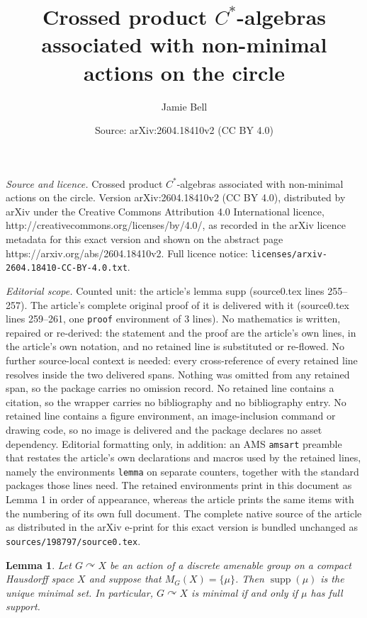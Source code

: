 \documentclass[10pt,a4paper]{amsart}
\title{Crossed product $C^*$-algebras associated with non-minimal actions on the circle}
\author{Jamie Bell}
\date{Source: arXiv:2604.18410v2 (CC BY 4.0)}
\newtheorem{lemma}{Lemma}
\DeclareMathOperator{\supp}{supp}
\begin{document}
\maketitle

\noindent\emph{Source and licence.} Crossed product $C^*$-algebras associated with non-minimal actions on the circle. Version arXiv:2604.18410v2 (CC BY 4.0), distributed by arXiv under the Creative Commons Attribution 4.0 International licence, http://creativecommons.org/licenses/by/4.0/, as recorded in the arXiv licence metadata for this exact version and shown on the abstract page https://arxiv.org/abs/2604.18410v2. Full licence notice: \texttt{licenses/arxiv-2604.18410-CC-BY-4.0.txt}.\par\smallskip

\noindent\textit{Editorial scope.} Counted unit: the article's lemma supp (source0.tex lines 255--257). The article's complete original proof of it is delivered with it (source0.tex lines 259--261, one \texttt{proof} environment of 3 lines). No mathematics is written, repaired or re-derived: the statement and the proof are the article's own lines, in the article's own notation, and no retained line is substituted or re-flowed.  No further source-local context is needed: every cross-reference of every retained line resolves inside the two delivered spans.  Nothing was omitted from any retained span, so the package carries no omission record.  No retained line contains a citation, so the wrapper carries no bibliography and no bibliography entry.  No retained line contains a figure environment, an image-inclusion command or drawing code, so no image is delivered and the package declares no asset dependency.  Editorial formatting only, in addition: an AMS \texttt{amsart} preamble that restates the article's own declarations and macros used by the retained lines, namely the environments \texttt{lemma} on separate counters, together with the standard packages those lines need.  The retained environments print in this document as Lemma 1 in order of appearance, whereas the article prints the same items with the numbering of its own full document.  The complete native source of the article as distributed in the arXiv e-print for this exact version is bundled unchanged as \texttt{sources/198797/source0.tex}.
\begin{lemma}\label{L-minimal supp}
    Let $G\curvearrowright X$ be an action of a discrete amenable group on a compact Hausdorff space $X$ and suppose that $M_G(X) = \{\mu\}$. Then $\supp(\mu)$ is the unique minimal set. In particular, $G\curvearrowright X$ is minimal if and only if $\mu$ has full support.  
\end{lemma}
\end{document}
